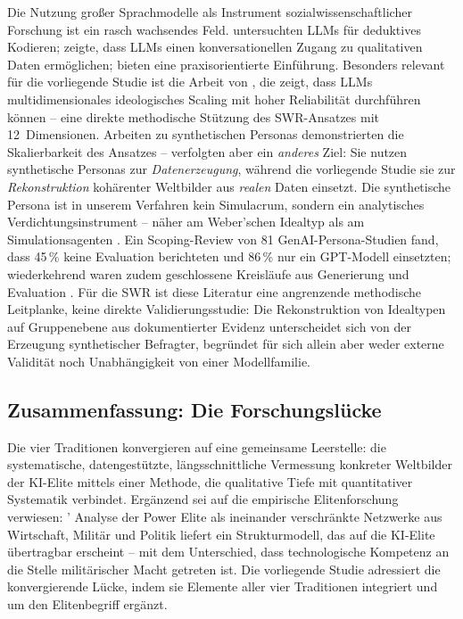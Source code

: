 \documentclass[12pt,a4paper]{article}
\begin{document}
Die Nutzung großer Sprachmodelle als Instrument sozialwissenschaftlicher Forschung ist ein rasch wachsendes Feld. \citet{Tai2024} untersuchten LLMs für deduktives Kodieren; \citet{Hayes2025} zeigte, dass LLMs einen konversationellen Zugang zu qualitativen Daten ermöglichen; \citet{NicmanisSpurrier2025} bieten eine praxisorientierte Einführung. Besonders relevant für die vorliegende Studie ist die Arbeit von \citet{OrnsteinEtAl2025}, die zeigt, dass LLMs multidimensionales ideologisches Scaling mit hoher Reliabilität durchführen können -- eine direkte methodische Stützung des SWR-Ansatzes mit 12~Dimensionen. Arbeiten zu synthetischen Personas \citep{Ge2024} demonstrierten die Skalierbarkeit des Ansatzes -- verfolgten aber ein \emph{anderes} Ziel: Sie nutzen synthetische Personas zur \emph{Datenerzeugung}, während die vorliegende Studie sie zur \emph{Rekonstruktion} kohärenter Weltbilder aus \emph{realen} Daten einsetzt. Die synthetische Persona ist in unserem Verfahren kein Simulacrum, sondern ein analytisches Verdichtungsinstrument -- näher am Weber'schen Idealtyp als am Simulationsagenten \citep[vgl.][]{Booth1961, NgRussell2000, JaraEttinger2019}. Ein Scoping-Review von 81 GenAI-Persona-Studien fand, dass 45\,\% keine Evaluation berichteten und 86\,\% nur ein GPT-Modell einsetzten; wiederkehrend waren zudem geschlossene Kreisläufe aus Generierung und Evaluation \citep{AminEtAl2026GenAIPersonas}. Für die SWR ist diese Literatur eine angrenzende methodische Leitplanke, keine direkte Validierungsstudie: Die Rekonstruktion von Idealtypen auf Gruppenebene aus dokumentierter Evidenz unterscheidet sich von der Erzeugung synthetischer Befragter, begründet für sich allein aber weder externe Validität noch Unabhängigkeit von einer Modellfamilie.


\subsection{Zusammenfassung: Die Forschungslücke}
\label{sec:forschungsstand:luecke}

Die vier Traditionen konvergieren auf eine gemeinsame Leerstelle: die systematische, datengestützte, längsschnittliche Vermessung konkreter Weltbilder der KI-Elite mittels einer Methode, die qualitative Tiefe mit quantitativer Systematik verbindet. Ergänzend sei auf die empirische Elitenforschung verwiesen: \citeauthor{Mills1956}' Analyse der \glqq Power Elite\grqq{} als ineinander verschränkte Netzwerke aus Wirtschaft, Militär und Politik liefert ein Strukturmodell, das auf die KI-Elite übertragbar erscheint -- mit dem Unterschied, dass technologische Kompetenz an die Stelle militärischer Macht getreten ist. Die vorliegende Studie adressiert die konvergierende Lücke, indem sie Elemente aller vier Traditionen integriert und um den Elitenbegriff ergänzt.
\end{document}
